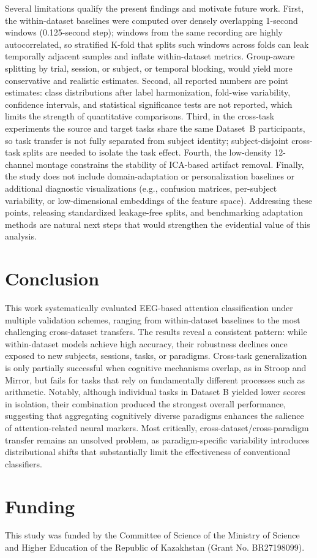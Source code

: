 \documentclass[10pt,letterpaper]{article}
\newcommand{\rev}[1]{\par\noindent\colorbox{yellow}{\parbox{\dimexpr\linewidth-2\fboxsep\relax}{#1}}\par}
\renewcommand{\rev}[1]{#1}
\begin{document}
\rev{Several limitations qualify the present findings and motivate future work. First, the within-dataset baselines were computed over densely overlapping 1-second windows (0.125-second step); windows from the same recording are highly autocorrelated, so stratified K-fold that splits such windows across folds can leak temporally adjacent samples and inflate within-dataset metrics. Group-aware splitting by trial, session, or subject, or temporal blocking, would yield more conservative and realistic estimates. Second, all reported numbers are point estimates: class distributions after label harmonization, fold-wise variability, confidence intervals, and statistical significance tests are not reported, which limits the strength of quantitative comparisons. Third, in the cross-task experiments the source and target tasks share the same Dataset~B participants, so task transfer is not fully separated from subject identity; subject-disjoint cross-task splits are needed to isolate the task effect. Fourth, the low-density 12-channel montage constrains the stability of ICA-based artifact removal. Finally, the study does not include domain-adaptation or personalization baselines or additional diagnostic visualizations (e.g., confusion matrices, per-subject variability, or low-dimensional embeddings of the feature space). Addressing these points, releasing standardized leakage-free splits, and benchmarking adaptation methods are natural next steps that would strengthen the evidential value of this analysis.}

\section*{Conclusion}

This work systematically evaluated EEG-based attention classification under multiple validation schemes, ranging from within-dataset baselines to the most challenging cross-dataset transfers. The results reveal a consistent pattern: while within-dataset models achieve high accuracy, their robustness declines once exposed to new subjects, sessions, tasks, or paradigms. Cross-task generalization is only partially successful when cognitive mechanisms overlap, as in Stroop and Mirror, but fails for tasks that rely on fundamentally different processes such as arithmetic. Notably, although individual tasks in Dataset B yielded lower scores in isolation, their combination produced the strongest overall performance, suggesting that aggregating cognitively diverse paradigms enhances the salience of attention-related neural markers. Most critically, cross-dataset/cross-paradigm transfer remains an unsolved problem, as paradigm-specific variability introduces distributional shifts that substantially limit the effectiveness of conventional classifiers.

\section*{Funding}

This study was funded by the Committee of Science of the Ministry of Science and Higher Education of the Republic of Kazakhstan (Grant No. BR27198099).

\nolinenumbers


\end{document}
